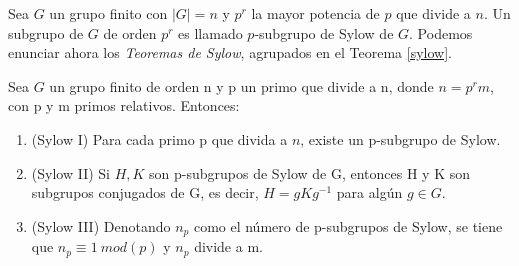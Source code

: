 








Sea $G$ un grupo finito con $|G|=n$ y $p^r$ la mayor potencia de $p$ que divide a $n$. Un subgrupo de $G$ de orden $p^r$ es llamado $p$-subgrupo de Sylow de $G$. Podemos enunciar ahora los \textit{Teoremas de Sylow}, agrupados en el Teorema \ref{sylow}.





\iffalse
\begin{theorem}[Teoremas de Sylow] \label{sylow}
\hfill
\begin{enumerate}
    \setlength\itemsep{0.23em}

    \item (Sylow I). Sea G un grupo finito y p un número primo tal que $p^i$ divide al orden de G. Entonces existe un subgrupo de G de orden $p^i$.
    \item (Sylow I). Sea G un grupo finito de orden  y p un número primo tal que $p^i$ divide al orden de G. Entonces existe un subgrupo de G de orden $p^i$.
    \item (Sylow II). Sea G un grupo y $H,K \leq G$  p-subgrupos de Sylow, entonces HP y K son conjugados de G, es decir, $H=gKg^{-1}$ para algún $g \in G$.
    \item (Sylow III). 	Sea G un grupo finito, p un número primo que divide al orden de G, con $|G|=p^im$ y $n_p =$ nº de p-subgrupos de Sylow del grupo G. Entonces $n_p \simeq 1mod(p)$ y $n_p$ divide a m.
    
\end{enumerate}
\end{theorem}
\fi

\begin{theorem} \label{sylow}
Sea $G$ un grupo finito de orden n y p un primo que divide a n, donde $n=p^rm$, con p y m primos relativos. Entonces:
\begin{enumerate}
    \setlength\itemsep{0.2em}
    \item (Sylow I) Para cada primo p que divida a $n$, existe un p-subgrupo de Sylow. \label{sylowI}
    \item (Sylow II) Si $H,K$ son p-subgrupos de Sylow de G, entonces H y K son subgrupos conjugados de G, es decir, $H=gKg^{-1}$ para algún $g \in G$. \label{sylowII}
    \item (Sylow III) Denotando $n_p$ como el número de p-subgrupos de Sylow, se tiene que  $n_p \equiv 1\:mod(p)$ y $n_p$ divide a m. \label{sylowIII}
\end{enumerate}

\end{theorem}

